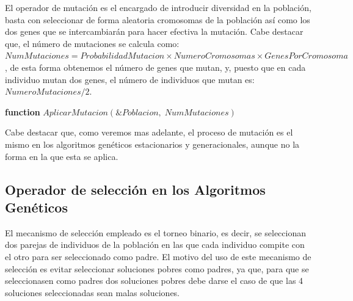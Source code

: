 \documentclass[11pt,a4paper]{article}
\begin{document}
	\noindent El operador de mutación es el encargado de introducir diversidad en la población, basta con seleccionar de forma aleatoria cromosomas de la población así como los dos genes que se intercambiarán para hacer efectiva la mutación. Cabe destacar que, el número de mutaciones se calcula como: $NumMutaciones = ProbabilidadMutacion \times NumeroCromosomas \times GenesPorCromosoma$, de esta forma obtenemos el número de genes que mutan, y, puesto que en cada individuo mutan dos genes, el número de individuos que mutan es:\\ $NumeroMutaciones/2$.
	
	\begin{algorithm}
		
		\textbf{function} $AplicarMutacion(\&Poblacion,\;NumMutaciones)$
		
	\end{algorithm}	
	
	\noindent Cabe destacar que, como veremos mas adelante, el proceso de mutación es el mismo en los algoritmos genéticos estacionarios y generacionales, aunque no la forma en la que esta se aplica.
	
	\subsection{Operador de selección en los Algoritmos Genéticos}
	
		\noindent El mecanismo de selección empleado es el torneo binario, es decir, se seleccionan dos parejas de individuos de la población en las que cada individuo compite con el otro para ser seleccionado como padre. El motivo del uso de este mecanismo de selección es evitar seleccionar soluciones pobres como padres, ya que, para que se seleccionasen como padres dos soluciones pobres debe darse el caso de que las 4 soluciones seleccionadas sean malas soluciones.
\end{document}
